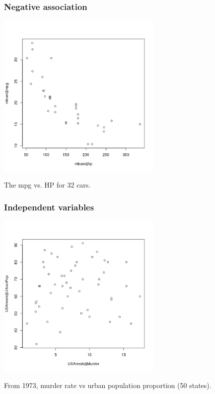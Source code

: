 \begin{frame}
\frametitle{Negative association}

\begin{center}
\includegraphics[width=0.6\textwidth]{figures/cars/cars}
\end{center}

\small
The mpg vs. HP for 32 cars.

\end{frame}


\begin{frame}
\frametitle{Independent variables}

\begin{center}
\includegraphics[width=0.6\textwidth]{figures/urbmur/urbmur}
\end{center}

\small
From 1973, murder rate vs urban population proportion (50 states).

\end{frame}



